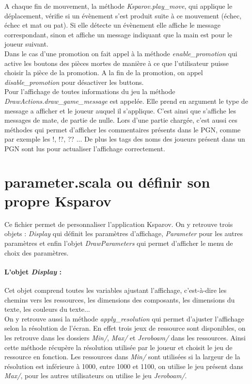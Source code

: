 \documentclass[a4paper]{article}
\begin{document}
A chaque fin de mouvement, la méthode \textit{Ksparov.play\_move}, qui applique le déplacement, vérifie si un évènement s'est produit suite à ce mouvement (échec, échec et mat ou pat). Si elle détecte un évènement elle affiche le message correspondant, sinon et affiche un message indiquant que la main est pour le joueur suivant. \\

Dans le cas d'une promotion on fait appel à la méthode \textit{enable\_promotion} qui active les boutons des pièces mortes de manière à ce que l'utilisateur puisse choisir la pièce de la promotion. A la fin de la promotion, on appel \textit{disable\_promotion} pour désactiver les buttons. \\

Pour l'affichage de toutes informations du jeu la méthode \textit{DrawActions.draw\_game\_message} est appelée. Elle prend en argument le type de message a afficher et le joueur auquel il s'applique. C'est ainsi que s'affiche les messages de mate, de partie de nulle. Lors d'une partie chargée, c'est aussi ces méthodes qui permet d'afficher les commentaires présents dans le PGN, comme par exemple les !, !?, ?? ... De plus les tags des noms des joueurs présent dans un PGN sont lus pour actualiser l'affichage correctement. 

\section{parameter.scala ou définir son propre Ksparov}

Ce fichier permet de personnaliser l'application Ksparov. On y retrouve trois objets : \textit{Display} qui définit les paramètres d'affichage, \textit{Parameter} pour les autres paramètres et enfin l'objet \textit{DrawParameters} qui permet d'afficher le menu de choix des paramètres. 

\paragraph{L'objet \textit{Display} :}Cet objet comprend toutes les variables ajustant l'affichage, c'est-à-dire les chemins vers les ressources, les dimensions des composants, les dimensions du texte, les couleurs du texte... \\

On y retrouve aussi la méthode \textit{apply\_resolution} qui permet d'ajuster l'affichage selon la résolution de l'écran. En effet trois jeux de ressource sont disponibles, on les retrouve dans les dossiers \textit{Min/}, \textit{Max/} et \textit{Jeroboam/} dans les ressources. Ainsi cette méthode récupère la résolution utilisée par le joueur et choisit le jeu de ressource en fonction. Les ressources dans \textit{Min/} sont utilisées si la largeur de la résolution est inférieure à 1000, entre 1000 et 1100, on utilise le jeu présent dans \textit{Max/}, pour les autres utilisateurs on utilise le jeu \textit{Jeroboam/}. 
\end{document}
